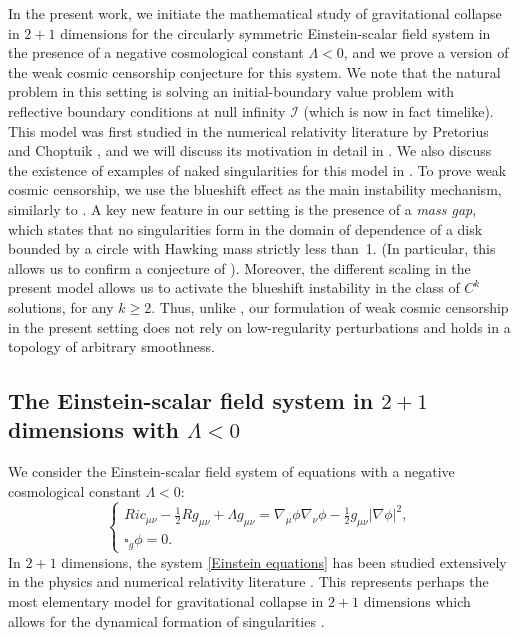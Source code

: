\documentclass[11pt]{article}
\numberwithin{equation}{section}
\begin{document}
In the present work, we initiate the mathematical study of gravitational collapse in $2+1$ dimensions for the circularly symmetric Einstein-scalar field system in the presence of a negative cosmological constant $\Lambda<0$, and we prove a version of the weak cosmic censorship conjecture for this system. We note that the natural problem in this setting is solving an initial-boundary value problem with reflective boundary conditions at null infinity $\mathcal{I}$ (which is now in fact timelike). This model was first studied in the numerical relativity literature by Pretorius and Choptuik \cite{Pretorius}, and we will discuss its motivation in detail in . We also discuss the existence of examples of naked singularities for this model in . To prove weak cosmic censorship, we use the blueshift effect as the main instability mechanism, similarly to \cite{ChrWCC}. A key new feature in our setting is the presence of a \textit{mass gap}, which states that no singularities form in the domain of dependence of a disk bounded by a circle with Hawking mass strictly less than~1. (In particular, this allows us to confirm a conjecture of \cite{ADS3}). Moreover, the different scaling in the present model allows us to activate the blueshift instability in the class of $C^k$ solutions, for any $k\geq2$. Thus, unlike \cite{ChrWCC}, our formulation of weak cosmic censorship in the present setting does not rely on low-regularity perturbations and holds in a topology of arbitrary smoothness.

\subsection{The Einstein-scalar field system in $2+1$ dimensions with $\Lambda<0$}\label{self intro sectioom}

We consider the Einstein-scalar field system of equations with a negative cosmological constant $\Lambda<0$:
\begin{equation}\label{Einstein equations}
    \begin{cases}
        Ric_{\mu\nu}-\frac{1}{2}Rg_{\mu\nu}+\Lambda g_{\mu\nu}=\nabla_{\mu}\phi\nabla_{\nu}\phi-\frac{1}{2}g_{\mu\nu}|\nabla\phi|^2,\\
        \square_{g}\phi=0.
    \end{cases}
\end{equation}
In $2+1$ dimensions, the system \eqref{Einstein equations} has been studied extensively in the physics and numerical relativity literature \cite{BTZ, BTZsurvey, Pretorius, Garfinkle, GarfGund, jalmuzna}. This represents
perhaps the most elementary model for gravitational collapse in $2+1$ dimensions which allows for the dynamical formation of singularities \cite{Pretorius, jalmuzna}.
\end{document}
